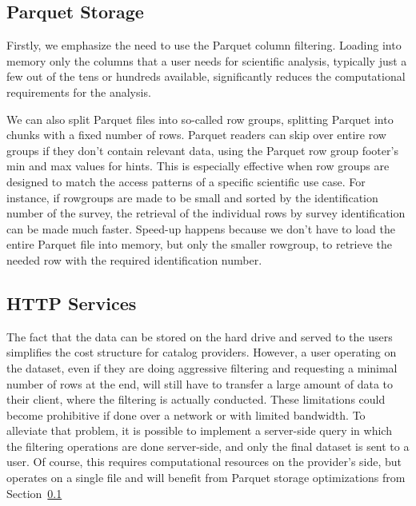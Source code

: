 \documentclass[11pt,a4paper]{ivoa}
\begin{document}
\subsection{Parquet Storage}\label{sec:parquetPerformance}
Firstly, we emphasize the need to use the Parquet column filtering. 
Loading into memory only the columns that a user needs for scientific analysis, typically just a few out of the tens or hundreds available, significantly reduces the computational requirements for the analysis.  \par 

We can also split Parquet files into so-called row groups, splitting Parquet into chunks with a fixed number of rows. 
Parquet readers can skip over entire row groups if they don't contain relevant data, using the Parquet row group footer's min and max values for hints. 
This is especially effective when row groups are designed to match the access patterns of a specific scientific use case. 
For instance, if rowgroups are made to be small and sorted by the identification number of the survey, the retrieval of the individual rows by survey identification can be made much faster. 
Speed-up happens because we don't have to load the entire Parquet file into memory, but only the smaller rowgroup, to retrieve the needed row with the required identification number.\par 

\subsection{HTTP Services}
The fact that the data can be stored on the hard drive and served to the users simplifies the cost structure for catalog providers. 
However, a user operating on the dataset, even if they are doing aggressive filtering and requesting a minimal number of rows at the end, will still have to transfer a large amount of data to their client, where the filtering is actually conducted. 
These limitations could become prohibitive if done over a network or with limited bandwidth. 
To alleviate that problem, it is possible to implement a server-side query in which the filtering operations are done server-side, and only the final dataset is sent to a user. 
Of course, this requires computational resources on the provider's side, but operates on a single file and will benefit from Parquet storage optimizations from Section~\ref{sec:parquetPerformance}
\end{document}
